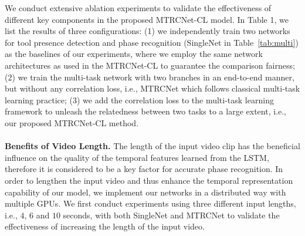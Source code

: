 \documentclass{elsarticle}
\begin{document}
We conduct extensive ablation experiments to validate the effectiveness of different key components in the proposed MTRCNet-CL model.
In Table 1, we list the results of three configurations:
(1) we independently train two networks for tool presence detection and phase recognition (SingleNet in Table~\ref{tab:multi}) as the baselines of our experiments,
where we employ the same network architectures as used in the MTRCNet-CL to guarantee the comparison fairness;
(2) we train the multi-task network with two branches in an end-to-end manner, but without any correlation loss, i.e., MTRCNet which follows classical multi-task learning practice;
(3) we add the correlation loss to the multi-task learning framework to unleash the relatedness between two tasks to a large extent, i.e., our proposed MTRCNet-CL method.
\\
\\
\textbf{Benefits of Video Length.}
The length of the input video clip has the beneficial influence on the quality of the temporal features learned from the LSTM, therefore it is considered to be a key factor for accurate phase recognition.
In order to lengthen the input video and thus enhance the temporal representation capability of our model, we implement our networks in a distributed way with multiple GPUs.
We first conduct experiments using three different input lengths, i.e., $4$, $6$ and $10$ seconds, with both SingleNet and MTRCNet to validate the effectiveness of increasing the length of the input video.
\end{document}
